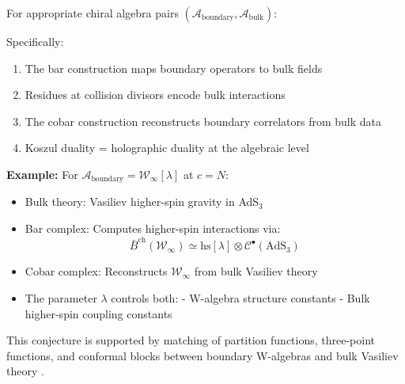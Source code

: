 \begin{conjecture}\label{conj:holographic-koszul}
For appropriate chiral algebra pairs $(\mathcal{A}_{\text{boundary}}, \mathcal{A}_{\text{bulk}})$:

\begin{center}
\end{center}

Specifically:
\begin{enumerate}
\item The bar construction maps boundary operators to bulk fields
\item Residues at collision divisors encode bulk interactions
\item The cobar construction reconstructs boundary correlators from bulk data
\item Koszul duality = holographic duality at the algebraic level
\end{enumerate}

\textbf{Example:} For $\mathcal{A}_{\text{boundary}} = \mathcal{W}_{\infty}[\lambda]$ at $c = N$:
\begin{itemize}
\item Bulk theory: Vasiliev higher-spin gravity in AdS$_3$
\item Bar complex: Computes higher-spin interactions via:
  $$\bar{B}^{\text{ch}}(\mathcal{W}_{\infty}) \simeq \text{hs}[\lambda] \otimes \mathcal{C}^{\bullet}(\text{AdS}_3)$$
\item Cobar complex: Reconstructs $\mathcal{W}_{\infty}$ from bulk Vasiliev theory
\item The parameter $\lambda$ controls both:
  - W-algebra structure constants
  - Bulk higher-spin coupling constants
\end{itemize}
\end{conjecture}

\begin{remark}
This conjecture is supported by matching of partition functions, three-point functions, and conformal blocks between boundary W-algebras and bulk Vasiliev theory \cite{Gaberdiel-Gopakumar}.
\end{remark}